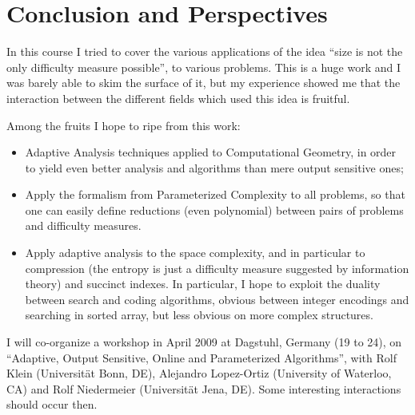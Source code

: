 

\chapter{Conclusion and Perspectives}
\label{cha:conclusion}


In this course I tried to cover the various applications of the idea
``size is not the only difficulty measure possible'', to various
problems.
%
This is a huge work and I was barely able to skim the surface of it,
but my experience showed me that the interaction between the different
fields which used this idea is fruitful.

\tinyskip 



Among the fruits I hope to ripe from this work:
\begin{itemize}
\item Adaptive Analysis techniques applied to Computational Geometry,
  in order to yield even better analysis and algorithms than mere
  output sensitive ones;

\item Apply the formalism from Parameterized Complexity to all
  problems, so that one can easily define reductions (even polynomial)
  between pairs of problems and difficulty measures.

\item Apply adaptive analysis to the space complexity, and in
  particular to compression (the entropy is just a difficulty measure
  suggested by information theory) and succinct indexes. In
  particular, I hope to exploit the duality between search and coding
  algorithms, obvious between integer encodings and searching in
  sorted array, but less obvious on more complex structures.
\end{itemize}

I will co-organize a workshop in April 2009 at Dagstuhl, Germany (19
to 24), on ``Adaptive, Output Sensitive, Online and Parameterized
Algorithms'', with Rolf Klein (Universit{\"a}t Bonn, DE), Alejandro
Lopez-Ortiz (University of Waterloo, CA) and Rolf Niedermeier
(Universit{\"a}t Jena, DE). 
%
Some interesting interactions should occur then.



